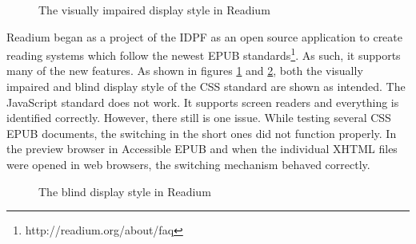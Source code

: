 \begin{figure}[H]
	\centering
	\caption{The visually impaired display style in Readium}
	\label{fig:ReadiumVi}
\end{figure}
Readium began as a project of the IDPF as an open source application to create reading systems which follow the newest EPUB standards\footnote{http://readium.org/about/faq}. As such, it supports many of the new features. As shown in figures \ref{fig:ReadiumVi} and \ref{fig:ReadiumBl}, both the visually impaired and blind display style of the CSS standard are shown as intended. The JavaScript standard does not work. It supports screen readers and everything is identified correctly. However, there still is one issue. While testing several CSS EPUB documents, the switching in the short ones did not function properly. In the preview browser in Accessible EPUB and when the individual XHTML files were opened in web browsers, the switching mechanism behaved correctly.


\begin{figure}[H]
	\centering
	\caption{The blind display style in Readium}
	\label{fig:ReadiumBl}
\end{figure}


